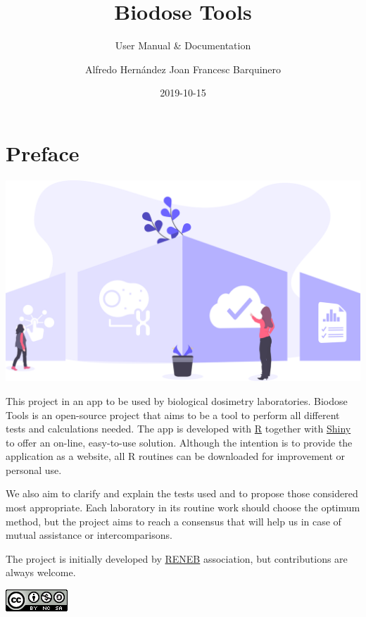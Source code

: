 \documentclass[]{scrartcl}
\title{Biodose Tools}
\subtitle{User Manual \& Documentation}
\author{Alfredo Hernández
Joan Francesc Barquinero}
\date{2019-10-15}
\begin{document}

\maketitle

{
\setcounter{tocdepth}{2}
\tableofcontents
}
\hypertarget{preface}{%
\section*{Preface}\label{preface}}

\begin{center}\includegraphics[width=0.8\linewidth]{images/home} \end{center}

This project in an app to be used by biological dosimetry laboratories. Biodose Tools is an open-source project that aims to be a tool to perform all different tests and calculations needed. The app is developed with \href{https://www.r-project.org/about.html}{R} \citep{R-base} together with \href{https://shiny.rstudio.com}{Shiny} \citep{R-shiny} to offer an on-line, easy-to-use solution. Although the intention is to provide the application as a website, all R routines can be downloaded for improvement or personal use.

We also aim to clarify and explain the tests used and to propose those considered most appropriate. Each laboratory in its routine work should choose the optimum method, but the project aims to reach a consensus that will help us in case of mutual assistance or intercomparisons.

The project is initially developed by \href{http://www.reneb.net}{RENEB} association, but contributions are always welcome.

\begin{center}\includegraphics[width=0.92in]{images/by-nc-sa} \end{center}
\end{document}
